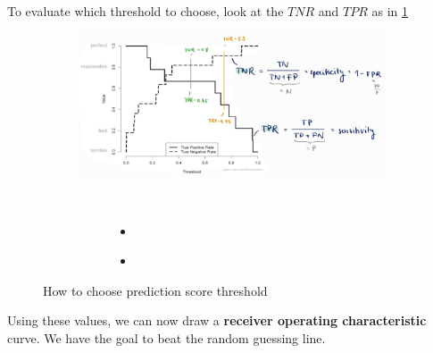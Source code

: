 To evaluate which threshold to choose, look at the $TNR$ and $TPR$ as in \ref{fig:7_rocc_tnr_vs_tpr}
\begin{figure}[H]
  \centering
  \begin{subfigure}{0.8\textwidth}
    \centering
    \includegraphics[width=\textwidth]{assets/sl/rocc__treshold_evaluation.png}
  \end{subfigure}

  \vspace*{0.5cm}
  \begin{subfigure}{\textwidth}
    \\

    \begin{subfigure}{0.45\textwidth}
      \begin{itemize}\footnotesize
        \item {}
      \end{itemize}
    \end{subfigure}
    \vspace*{0.05\textwidth}
    \begin{subfigure}{0.45\textwidth}
      \begin{itemize}\footnotesize
        \item {}
      \end{itemize}
    \end{subfigure}
  \end{subfigure}

  \caption{How to choose prediction score threshold}
  \label{fig:7_rocc_tnr_vs_tpr}
\end{figure}

Using these values, we can now draw a \textbf{receiver operating characteristic} curve. We have the goal to beat the random guessing line.

